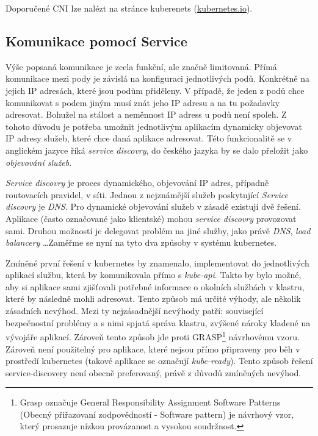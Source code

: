 \cite{thekubernetesauthors_2022_cluster} 
Doporučené CNI lze nalézt na stránce kuberenets (\href{https://kubernetes.io/docs/concepts/cluster-administration/addons/#networking-and-network-policy}{kubernetes.io}).

\subsection{Komunikace pomocí Service}
Výše popsaná komunikace je zcela funkční, ale značně limitovaná. Přímá komunikace mezi pody je závislá na konfiguraci jednotlivých podů. Konkrétně na jejich IP adresách, které jsou podům přiděleny. V případě, že jeden z podů chce komunikovat s podem jiným musí znát jeho IP adresu a na tu požadavky adresovat. Bohužel na stálost a neměnnost IP adress u podů není spoleh. Z tohoto důvodu je potřeba umožnit jednotlivým aplikacím dynamicky objevovat IP adresy služeb, které chce daná aplikace adresovat. Této funkcionalitě se v anglickém jazyce říká \textit{service discovry}, do českého jazyka by se dalo přeložit jako \textit{objevování služeb}. 

\textit{Service discovry} je proces dynamického, objevování IP adres, případně routovacích pravidel, v síti. Jednou z nejznámější služeb poskytující \textit{Service discovry} je \textit{DNS}. Pro dynamické objevování služeb v zásadě existují dvě řešení. Aplikace (často označované jako klientské) mohou \textit{service discovry} provozovat sami. Druhou možností je delegovat problém na jiné služby, jako právě \textit{DNS}, \textit{load balancery} \ldots Zaměřme se nyní na tyto dva způsoby v systému kubernetes. 

Zmíněné první řešení v kubernetes by znamenalo, implementovat do jednotlivých aplikací službu, která by komunikovala přímo s \textit{kube-api}. Takto by bylo možné, aby si aplikace sami zjišťovali potřebné informace o okolních službách v klastru, které by následně mohli adresovat. Tento způsob má určité výhody, ale několik zásadních nevýhod. Mezi ty nejzásadnější nevýhody patří: související bezpečnostní problémy a s nimi spjatá správa klastru, zvýšené nároky kladené na vývojáře aplikací. Zároveň tento způsob jde proti GRASP\footnote{Grasp označuje General Responsibility Assignment Software Patterns (Obecný přiřazovaní zodpovědností - Software pattern) je návrhový vzor, který prosazuje nízkou provázanost a vysokou soudržnost.}\cite{bisi1} návrhovému vzoru. Zároveň není použitelný pro aplikace, které nejsou přímo připraveny pro běh v prostředí kubernetes (takové aplikace se označují \textit{kube-ready}). Tento způsob řešení service-discovery není obecně preferovaný, právě z důvodů zmíněných nevýhod.


